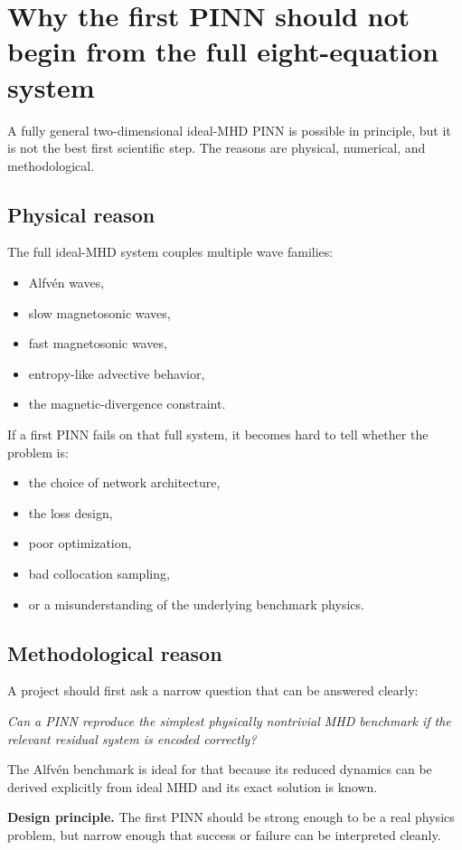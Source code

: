 \documentclass[11pt]{article}
\begin{document}
\section{Why the first PINN should not begin from the full eight-equation system}
A fully general two-dimensional ideal-MHD PINN is possible in principle, but it is not the best first scientific step. The reasons are physical, numerical, and methodological.

\subsection{Physical reason}
The full ideal-MHD system couples multiple wave families:
\begin{itemize}[leftmargin=1.8em]
    \item Alfv\'en waves,
    \item slow magnetosonic waves,
    \item fast magnetosonic waves,
    \item entropy-like advective behavior,
    \item the magnetic-divergence constraint.
\end{itemize}
If a first PINN fails on that full system, it becomes hard to tell whether the problem is:
\begin{itemize}[leftmargin=1.8em]
    \item the choice of network architecture,
    \item the loss design,
    \item poor optimization,
    \item bad collocation sampling,
    \item or a misunderstanding of the underlying benchmark physics.
\end{itemize}

\subsection{Methodological reason}
A project should first ask a narrow question that can be answered clearly:
\begin{center}
\emph{Can a PINN reproduce the simplest physically nontrivial MHD benchmark if the relevant residual system is encoded correctly?}
\end{center}
The Alfv\'en benchmark is ideal for that because its reduced dynamics can be derived explicitly from ideal MHD and its exact solution is known.

\begin{physicsbox}
\textbf{Design principle.} The first PINN should be strong enough to be a real physics problem, but narrow enough that success or failure can be interpreted cleanly.
\end{physicsbox}
\end{document}
